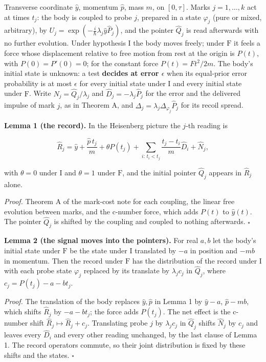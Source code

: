 \documentclass[11pt,a4paper]{article}
\begin{document}
Transverse coordinate \(\hat y\), momentum \(\hat p\), mass \(m\), on
\([0,\tau]\). Marks \(j=1,\dots,k\) act at times \(t_j\): the body is
coupled to probe \(j\), prepared in a state \(\varphi_j\) (pure or
mixed, arbitrary), by
\(U_j=\exp(-\frac i\hbar\lambda_j\hat y\hat P_j)\), and the pointer
\(\hat Q_j\) is read afterwards with no further evolution. Under
hypothesis \(\mathrm I\) the body moves freely; under \(\mathrm F\) it
feels a force whose displacement relative to free motion from rest at
the origin is \(P(t)\), with \(P(0)=P'(0)=0\); for the constant force
\(P(t)=Ft^2/2m\). The body's initial state is unknown: a test
\textbf{decides at error \(\epsilon\)} when its equal-prior error
probability is at most \(\epsilon\) for every initial state under
\(\mathrm I\) and every initial state under \(\mathrm F\). Write
\(\hat N_j=\hat Q_j/\lambda_j\) and \(\hat D_j=-\lambda_j\hat P_j\) for
the error and the delivered impulse of mark \(j\), as in Theorem A, and
\(\Delta_j=\lambda_j\Delta_{\varphi_j}\hat P_j\) for its recoil spread.

\textbf{Lemma 1 (the record).} In the Heisenberg picture the \(j\)-th
reading is

\[\hat R_j=\hat y+\frac{\hat p\,t_j}{m}+\theta P(t_j)
+\sum_{i:\,t_i<t_j}\frac{t_j-t_i}{m}\hat D_i+\hat N_j ,\]

with \(\theta=0\) under \(\mathrm I\) and \(\theta=1\) under
\(\mathrm F\), and the initial pointer \(\hat Q_j\) appears in
\(\hat R_j\) alone.

\emph{Proof.} Theorem A of the mark-cost note for each coupling, the
linear free evolution between marks, and the c-number force, which adds
\(P(t)\) to \(\hat y(t)\). The pointer \(\hat Q_j\) is shifted by the
coupling and coupled to nothing afterwards. \(\square\)

\textbf{Lemma 2 (the signal moves into the pointers).} For real \(a,b\)
let the body's initial state under \(\mathrm F\) be the state under
\(\mathrm I\) translated by \(-a\) in position and \(-mb\) in momentum.
Then the record under \(\mathrm F\) has the distribution of the record
under \(\mathrm I\) with each probe state \(\varphi_j\) replaced by its
translate by \(\lambda_jc_j\) in \(\hat Q_j\), where
\(c_j=P(t_j)-a-bt_j\).

\emph{Proof.} The translation of the body replaces \(\hat y,\hat p\) in
Lemma 1 by \(\hat y-a\), \(\hat p-mb\), which shifts \(\hat R_j\) by
\(-a-bt_j\); the force adds \(P(t_j)\). The net effect is the c-number
shift \(\hat R_j\mapsto\hat R_j+c_j\). Translating probe \(j\) by
\(\lambda_jc_j\) in \(\hat Q_j\) shifts \(\hat N_j\) by \(c_j\) and
leaves every \(\hat D_i\) and every other reading unchanged, by the last
clause of Lemma 1. The record operators commute, so their joint
distribution is fixed by these shifts and the states. \(\square\)
\end{document}
